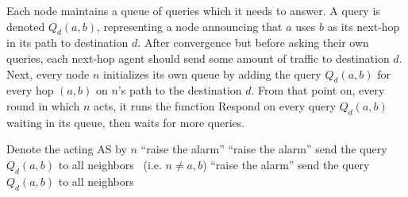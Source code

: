 \documentclass[10pt]{article}
\begin{document}
  Each node maintains a queue of queries which it needs to answer.
  A query is denoted $Q_d(a,b)$, representing a node announcing that
  $a$ uses $b$ as its next-hop in its path to destination $d$.
  After convergence but before asking their own queries, each next-hop agent
  should send some amount of traffic to destination $d$.
  Next, every node $n$ initializes its own queue by adding the query $Q_d(a,b)$
  for every hop $(a,b)$ on $n$'s path to the destination $d$.
  From that point on, every round in which $n$ acts, it runs the function
  {\sc Respond} on every query $Q_d(a,b)$ waiting in its queue,
  then waits for more queries.

  \begin{algorithmic}[1]
    \State Denote the acting AS by $n$
        \State \Return
      \EndIf
          \State ``raise the alarm'' \label{line:sourceRaise}
        \EndIf
        \State \Return
      \EndIf
          \State``raise the alarm'' \label{line:targetRaise}
        \Else
          \State send the query $Q_d(a,b)$ to all neighbors
            \label{line:falseNegativeForward}
        \EndIf
      \Else \ (i.e. $n \neq a,b$)
          \State ``raise the alarm'' \label{line:otherRaise}
        \Else
          \State send the query $Q_d(a,b)$ to all neighbors
            \label{line:cluelessForward}
        \EndIf
      \EndIf
    \EndFunction

  \end{algorithmic}
\end{document}
